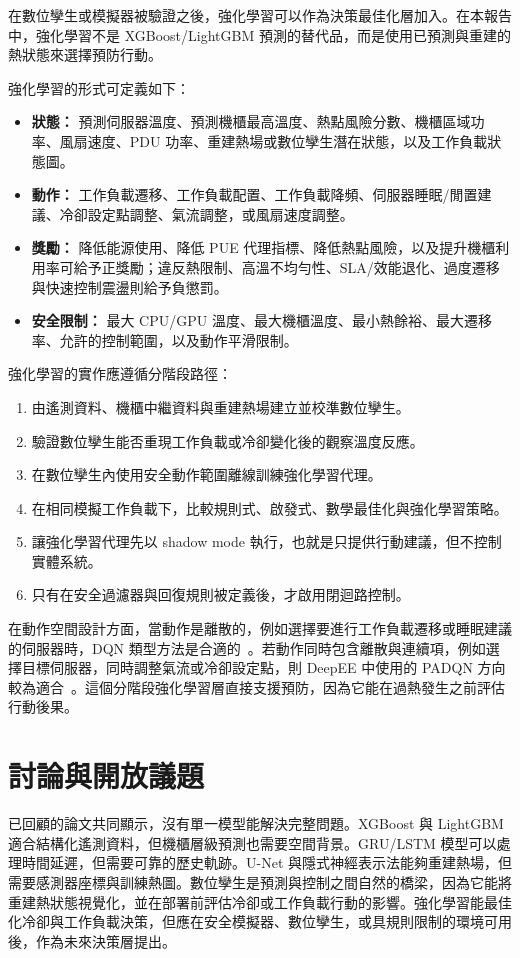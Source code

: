 \documentclass[12pt,a4paper]{article}
\begin{document}
在數位孿生或模擬器被驗證之後，強化學習可以作為決策最佳化層加入。在本報告中，強化學習不是 XGBoost/LightGBM 預測的替代品，而是使用已預測與重建的熱狀態來選擇預防行動。

強化學習的形式可定義如下：
\begin{itemize}
\item \textbf{狀態：} 預測伺服器溫度、預測機櫃最高溫度、熱點風險分數、機櫃區域功率、風扇速度、PDU 功率、重建熱場或數位孿生潛在狀態，以及工作負載狀態圖。
\item \textbf{動作：} 工作負載遷移、工作負載配置、工作負載降頻、伺服器睡眠/閒置建議、冷卻設定點調整、氣流調整，或風扇速度調整。
\item \textbf{獎勵：} 降低能源使用、降低 PUE 代理指標、降低熱點風險，以及提升機櫃利用率可給予正獎勵；違反熱限制、高溫不均勻性、SLA/效能退化、過度遷移與快速控制震盪則給予負懲罰。
\item \textbf{安全限制：} 最大 CPU/GPU 溫度、最大機櫃溫度、最小熱餘裕、最大遷移率、允許的控制範圍，以及動作平滑限制。
\end{itemize}

強化學習的實作應遵循分階段路徑：
\begin{enumerate}
\item 由遙測資料、機櫃中繼資料與重建熱場建立並校準數位孿生。
\item 驗證數位孿生能否重現工作負載或冷卻變化後的觀察溫度反應。
\item 在數位孿生內使用安全動作範圍離線訓練強化學習代理。
\item 在相同模擬工作負載下，比較規則式、啟發式、數學最佳化與強化學習策略。
\item 讓強化學習代理先以 shadow mode 執行，也就是只提供行動建議，但不控制實體系統。
\item 只有在安全過濾器與回復規則被定義後，才啟用閉迴路控制。
\end{enumerate}

在動作空間設計方面，當動作是離散的，例如選擇要進行工作負載遷移或睡眠建議的伺服器時，DQN 類型方法是合適的~\cite{yuan_2025}。若動作同時包含離散與連續項，例如選擇目標伺服器，同時調整氣流或冷卻設定點，則 DeepEE 中使用的 PADQN 方向較為適合~\cite{ran_2019}。這個分階段強化學習層直接支援預防，因為它能在過熱發生之前評估行動後果。

\section{討論與開放議題}

已回顧的論文共同顯示，沒有單一模型能解決完整問題。XGBoost 與 LightGBM 適合結構化遙測資料，但機櫃層級預測也需要空間背景。GRU/LSTM 模型可以處理時間延遲，但需要可靠的歷史軌跡。U-Net 與隱式神經表示法能夠重建熱場，但需要感測器座標與訓練熱圖。數位孿生是預測與控制之間自然的橋梁，因為它能將重建熱狀態視覺化，並在部署前評估冷卻或工作負載行動的影響。強化學習能最佳化冷卻與工作負載決策，但應在安全模擬器、數位孿生，或具規則限制的環境可用後，作為未來決策層提出。
\end{document}

